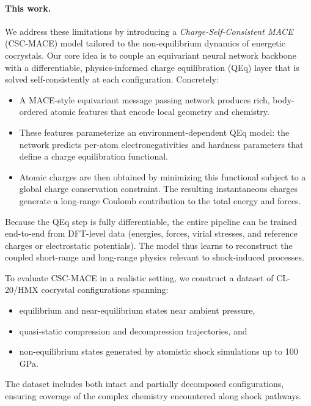 \documentclass{article}
\begin{document}
\paragraph{This work.}
We address these limitations by introducing a \emph{Charge-Self-Consistent MACE} (CSC-MACE) model tailored to the non-equilibrium dynamics of energetic cocrystals. Our core idea is to couple an equivariant neural network backbone with a differentiable, physics-informed charge equilibration (QEq) layer that is solved self-consistently at each configuration. Concretely:
\begin{itemize}
    \item A MACE-style equivariant message passing network produces rich, body-ordered atomic features that encode local geometry and chemistry.
    \item These features parameterize an environment-dependent QEq model: the network predicts per-atom electronegativities and hardness parameters that define a charge equilibration functional.
    \item Atomic charges are then obtained by minimizing this functional subject to a global charge conservation constraint. The resulting instantaneous charges generate a long-range Coulomb contribution to the total energy and forces.
\end{itemize}

Because the QEq step is fully differentiable, the entire pipeline can be trained end-to-end from DFT-level data (energies, forces, virial stresses, and reference charges or electrostatic potentials). The model thus learns to reconstruct the coupled short-range and long-range physics relevant to shock-induced processes.

To evaluate CSC-MACE in a realistic setting, we construct a dataset of CL-20/HMX cocrystal configurations spanning:
\begin{itemize}
    \item equilibrium and near-equilibrium states near ambient pressure,
    \item quasi-static compression and decompression trajectories, and
    \item non-equilibrium states generated by atomistic shock simulations up to 100 GPa.
\end{itemize}
The dataset includes both intact and partially decomposed configurations, ensuring coverage of the complex chemistry encountered along shock pathways.
\end{document}
